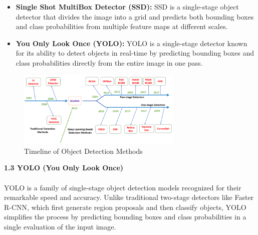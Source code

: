 \begin{itemize}
\begin{itemize}
    \item \textbf{Single Shot MultiBox Detector (SSD):} SSD is a single-stage object detector that divides the image into a grid and predicts both bounding boxes and class probabilities from multiple feature maps at different scales.
    \item \textbf{You Only Look Once (YOLO):} YOLO is a single-stage detector known for its ability to detect objects in real-time by predicting bounding boxes and class probabilities directly from the entire image in one pass.
  \end{itemize}
  \begin{figure}[h!]
    \centering
    \includegraphics[width=0.7\textwidth]{images/Timeline.png}
    \caption{Timeline of Object Detection Methods}
    \label{fig:enter-label}
  \end{figure}
\end{itemize}
%
{ \textbf{1.3 {YOLO (You Only Look Once)}}}\\\\
%
YOLO is a family of single-stage object detection models recognized for their remarkable speed and accuracy. Unlike traditional two-stage detectors like Faster R-CNN, which first generate region proposals and then classify objects, YOLO simplifies the process by predicting bounding boxes and class probabilities in a single evaluation of the input image.
\\\newline
